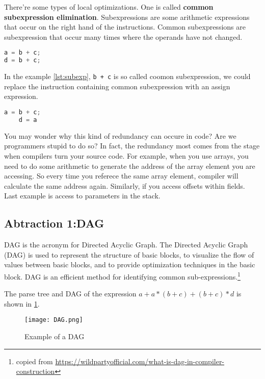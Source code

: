 There're some types of local optimizations. 
One is called \textbf{common subexpression elimination}. Subexpressions are some arithmetic expressions that occur on the
 right hand of the instructions. Common subexpressions are subexpression that occur many times where the operands have not 
 changed.
 
\begin{lstlisting}[language=C, caption=Subexpression example,label=lst:subexp]
a = b + c;
d = b + c;
\end{lstlisting}

In the example \ref{lst:subexp}, \texttt{b + c} is so called coomon subexpression, we could replace the instruction containing 
common subexpression with an assign expression. 


\begin{lstlisting}[language=C, caption=code snippet applied common subexpression elimination to \ref{lst:subexp},label=lst:transsubexpr]
    a = b + c;
    d = a
\end{lstlisting}

You may wonder why this kind of redundancy can occure in code? Are we programmers stupid to do so? In fact, 
the redundancy most comes from the stage when compilers  turn your source code. For example, when you use arrays,
you need to do some arithmetic to generate the address of the array element you are accessing. So every time you referece the same
array element, compiler will calculate the same address again. Similarly, if you access offsets within fields. Last example is 
access to parameters in the stack. 


\subsection{Abtraction 1:DAG}

DAG is the acronym for Directed Acyclic Graph. The Directed Acyclic Graph (DAG) is used to represent the 
structure of basic blocks, to visualize the flow of values between basic blocks, and to provide 
optimization techniques in the basic block. DAG is an efficient method for identifying common 
sub-expressions.\footnote{copied from \url{https://wildpartyofficial.com/what-is-dag-in-compiler-construction}}



The parse tree and DAG of the expression \(a + a*(b+c) + (b+c) *d \) is shown in \ref{fig:DAG}.


\begin{figure}[h]
    \centering
    \texttt{[image: DAG.png]}
    \caption{Example of a DAG}
    \label{fig:DAG}
\end{figure}



